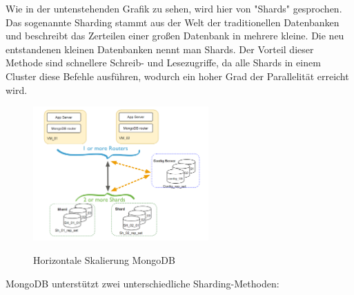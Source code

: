 Wie in der untenstehenden Grafik zu sehen, wird hier von "Shards" gesprochen. Das sogenannte Sharding stammt aus der Welt der traditionellen Datenbanken und beschreibt das Zerteilen einer großen Datenbank in mehrere kleine. Die neu entstandenen kleinen Datenbanken nennt man Shards. Der Vorteil dieser Methode sind schnellere Schreib- und Lesezugriffe, da alle Shards in einem Cluster diese Befehle ausführen, wodurch ein hoher Grad der Parallelität erreicht wird.
\begin{figure}[h!]
    \centering
    \includegraphics[width=0.6\textwidth]{pics/vertical_scaling_mongodb.png}
    \caption{Horizontale Skalierung MongoDB}
    \cite{vertical_scaling_mongodb}
    \label{fig:enter-label}
\end{figure}
\newline
MongoDB unterstützt zwei unterschiedliche Sharding-Methoden:

